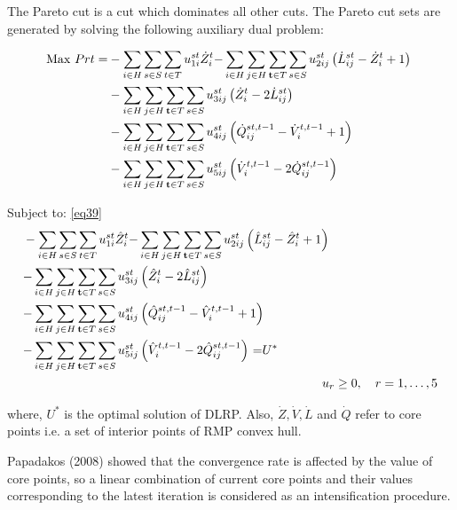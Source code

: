 \documentclass[review]{elsarticle}
\begin{document}
The Pareto cut is a cut which dominates all other cuts. The Pareto cut sets are generated by solving the following auxiliary dual problem:

\begin{align}\label{eq48}
{\rm Max}\ Prt=&-\sum_{i\in H}{\sum_{s\in S}{\sum_{t\in T}{u^{st}_{1i}{\dot{Z}}^t_i}}}\mathbf{ -}\sum_{i\in H}{\sum_{j\in H}{\sum_{\mathbf{ t}\in T}{\sum_{s\in S}{u^{st}_{2ij}\left({\dot{L}}^{st}_{ij}-{\dot{Z}}^t_i+1\right)\ }}}}\\
&-\sum_{i\in H}{\sum_{j\in H}{\sum_{\mathbf{ t}\in T}{\sum_{s\in S}{u^{st}_{3ij}\left({\dot{Z}}^t_i-2{\dot{L}}^{st}_{ij}\right)\ }}}}\cr
&-\sum_{i\in H}{\sum_{j\in H}{\sum_{\mathbf{ t}\in T}{\sum_{s\in S}{u^{st}_{4ij}\left({\dot{Q}}^{st,t-1}_{ij}-{\dot{V}}^{t,t-1}_i+1\right)\ }}}}\nonumber\\
&-\sum_{i\in H}{\sum_{j\in H}{\sum_{\mathbf{ t}\in T}{\sum_{s\in S}{u^{st}_{5ij}\left({\dot{V}}^{t,t-1}_i-2{\dot{Q}}^{st,t-1}_{ij}\right)\ }}}}\nonumber
\end{align} 

Subject to: \eqref{eq39}
\begin{align}\label{eq49}
&-\sum_{i\in H}{\sum_{s\in S}{\sum_{t\in T}{u^{st}_{1i}{\hat{Z}}^t_i}}}\mathbf{ -}\sum_{i\in H}{\sum_{j\in H}{\sum_{\mathbf{ t}\in T}{\sum_{s\in S}{u^{st}_{2ij}\left({\hat{L}}^{st}_{ij}-{\hat{Z}}^t_i+1\right)\ }}}}\cr
&\mathbf{ -}\sum_{i\in H}{\sum_{j\in H}{\sum_{\mathbf{ t}\in T}{\sum_{s\in S}{u^{st}_{3ij}\left({\hat{Z}}^t_i-2{\hat{L}}^{st}_{ij}\right)\ }}}}\\
&\mathbf{ -}\sum_{i\in H}{\sum_{j\in H}{\sum_{\mathbf{ t}\in T}{\sum_{s\in S}{u^{st}_{4ij}\left({\hat{Q}}^{st,t-1}_{ij}-{\hat{V}}^{t,t-1}_i+1\right)\ }}}}\cr
&\mathbf{ -}\sum_{i\in H}{\sum_{j\in H}{\sum_{\mathbf{ t}\in T}{\sum_{s\in S}{u^{st}_{5ij}\left({\hat{V}}^{t,t-1}_i-2{\hat{Q}}^{st,t-1}_{ij}\right)\ }}}}\mathbf{ =}{{ U}}^{\mathbf{ *}}\nonumber\\
&\hspace*{8.5cm} u_r\geq 0,\quad r=1,\ldots,5\nonumber
\end{align}

where, $U^*$ is the optimal solution of DLRP. Also, $\dot{Z},\dot{V},\dot{L}$ and $\dot{Q}$ refer to core points i.e. a set of interior points of RMP convex hull. 

Papadakos (2008) showed that the convergence rate is affected by the value of core points, so a linear combination of current core points and their values corresponding to the latest iteration is considered as an intensification procedure.
\end{document}
